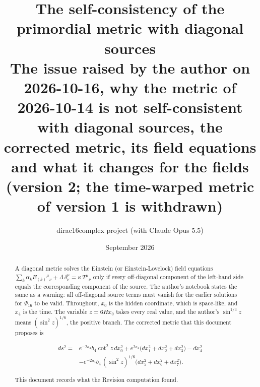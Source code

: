 \documentclass[11pt]{article}
\title{The self-consistency of the primordial metric with diagonal sources\\[0.5em]\large The issue raised by the author on 2026-10-16, why the metric of 2026-10-14 is not self-consistent with diagonal sources, the corrected metric, its field equations and what it changes for the fields (version 2; the time-warped metric of version 1 is withdrawn)}
\author{dirac16complex project (with Claude Opus 5.5)}
\date{September 2026}
\begin{document}
\maketitle
\tableofcontents
\newpage
\begin{abstract}
A diagonal metric solves the Einstein (or Einstein-Lovelock) field equations $\sum_k \alpha_k E_{(k)}{}^\mu{}_\nu + \Lambda\,\delta^\mu_\nu = \kappa\,T^\mu{}_\nu$ only if every off-diagonal component of the left-hand side equals the corresponding component of the source. The author's notebook states the same as a warning: all off-diagonal source terms must vanish for the earlier solutions for $\Psi_{16}$ to be valid. Throughout, $x_0$ is the hidden coordinate, which is space-like, and $x_4$ is the time. The variable $z = 6Hx_0$ takes every real value, and the author's $\sin^{1/3}z$ means $(\sin^2 z)^{1/6}$, the positive branch. The corrected metric that this document proposes is

\[
\begin{aligned}
ds^2 = {} & e^{-2a_4}b_4\cot^2 z\,dx_0^2 + e^{2a_4}\big(dx_1^2 + dx_2^2 + dx_3^2\big) - dx_4^2 \\
& - e^{-2a_4}b_4\,(\sin^2 z)^{1/6}\big(dx_5^2 + dx_6^2 + dx_7^2\big) .
\end{aligned}
\]

This document records what the Revision computation found.


\end{abstract}
\end{document}
